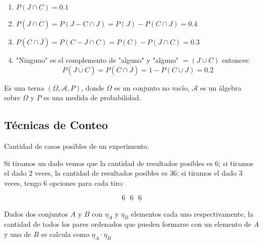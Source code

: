 \documentclass[../main.tex]{subfiles}
\begin{document}
\begin{example*}
\begin{itemize}
\begin{enumerate}[label=\alph*)]
                \item $P(J \cap C) = 0.1$
                \item $P(J \cap \overline{C}) = P(J - C \cap J) = P(J) - P(C \cap J) = 0.4$
                \item $P(C \cap \overline{J}) = P(C - J \cap C) = P(C) - P(J \cap C) = 0.3$
                \item "Ninguno" es el complemento de "alguno" y "alguno" $= (J \cup C)$ entonces:
                    \begin{equation*}
                        P(\overline{J \cup C}) = P(\overline{C} \cap \overline{J}) = 1 - P(C \cup J) = 0.2
                    \end{equation*}
            \end{enumerate}
    \end{itemize}
\end{example*}

\begin{definition}
    Es una terna $(\Omega, \mathcal{A}, P)$, donde $\Omega$ es un conjunto no vacío, $\mathcal{A}$ es un álgebra sobre $\Omega$ y $P$ es una medida de probabilidad.
\end{definition}

\subsection{Técnicas de Conteo}

\begin{definition}[\#CP]
    Cantidad de casos posibles de un experimento.
\end{definition}

Si tiramos un dado vemos que la cantidad de resultados posibles es $6$; si tiramos el dado $2$ veces, la cantidad de resultados posibles es $36$; si tiramos el dado $3$ veces, tengo $6$ opciones para cada tiro:

\begin{equation*}
    \underline{6}\text{ }\underline{6}\text{ }\underline{6}
\end{equation*}

\begin{definition}
    Dados dos conjuntos $A$ y $B$ con $\eta_{A}$ y $\eta_{B}$ elementos cada uno respectivamente, la cantidad de todos los pares ordenados que pueden formarse con un elemento de $A$ y uno de $B$ se calcula como $\eta_{A} \cdot \eta_{B}$
\end{definition}
\end{document}
